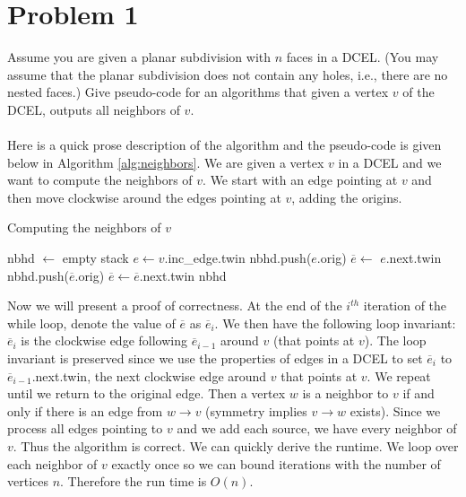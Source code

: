 \documentclass[11pt]{article}
\begin{document}

\newpage
\section*{Problem 1}

Assume you are given a planar subdivision with $n$ faces in a DCEL. (You may
assume that the planar subdivision does not contain any holes, i.e., there are
no nested faces.) Give pseudo-code for an algorithms that given a vertex $v$ of
the DCEL, outputs all neighbors of $v$. \\\\
\answer
Here is a quick prose description of the algorithm and the pseudo-code is given below in Algorithm \ref{alg:neighbors}.
We are given a vertex $v$ in a DCEL and we want to compute the neighbors of $v$.
We start with an edge pointing at $v$ and then move clockwise around the edges pointing at $v$, adding the origins.

\begin{algorithm}
\caption{Computing the neighbors of $v$}
\label{alg:neighbors}
    \begin{algorithmic}[1]
        \State nbhd $\gets $ empty stack
        \State $e \gets v$.inc\_edge.twin
        \State nbhd.push($e$.orig)
        \State $\overline{e} \gets$ $e$.next.twin
            \State nbhd.push($\overline{e}$.orig)
            \State $\overline{e} \gets \overline{e}$.next.twin
        \EndWhile
        \State \Return nbhd
    \EndFunction
    \end{algorithmic}
\end{algorithm}

Now we will present a proof of correctness.
At the end of the $i^{th}$ iteration of the while loop, denote the value of $\overline{e}$ as $\overline{e}_i$.
We then have the following loop invariant: $\overline{e}_{i}$ is the clockwise edge following $\overline{e}_{i-1}$ around $v$ (that points at $v$).
The loop invariant is preserved since we use the properties of edges in a DCEL to set $\overline{e}_{i}$ to $\overline{e}_{i-1}$.next.twin, the next clockwise edge around $v$ that points at $v$.
We repeat until we return to the original edge.
Then a vertex $w$ is a neighbor to $v$ if and only if there is an edge from $w \to v$ (symmetry implies $v \to w$ exists).
Since we process all edges pointing to $v$ and we add each source, we have every neighbor of $v$.
Thus the algorithm is correct.
We can quickly derive the runtime.
We loop over each neighbor of $v$ exactly once so we can bound iterations with the number of vertices $n$.
Therefore the run time is $O(n)$.
\end{document}
